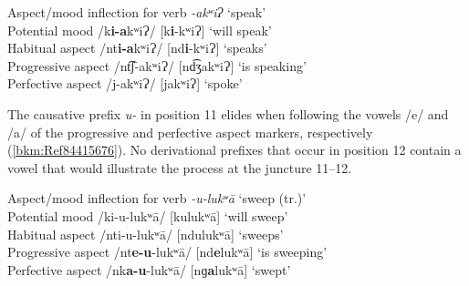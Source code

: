 \documentclass[output=paper]{langscibook}
\begin{document}
\ea\label{bkm:Ref14616697}Aspect/mood inflection for verb \textit{{}-akʷiɁ} `speak'\\ 

Potential mood \hspace{1.05cm}  /k\textbf{i-a}kʷiɁ/ \hspace{1.15cm}[k\textbf{i}{}-kʷiɁ] \hspace{1.15cm}`will speak' \\

Habitual aspect\hspace{1cm}     /nt\textbf{i-a}kʷiɁ/ \hspace{1cm}  [nd\textbf{i}{}-kʷiɁ] \hspace{1cm}`speaks' \\

Progressive aspect\hspace{0.55cm} /nt͡ʃ{}-akʷiɁ/ \hspace{1cm} [nd͡ʒakʷiɁ]  \hspace{0.9cm}`is speaking' \\

Perfective aspect\hspace{0.9cm} /j-akʷiɁ/\hspace{1.33cm} [jakʷiɁ] \hspace{1.25cm} `spoke' \\

\z 


The causative prefix \textit{u-} in position 11 elides when following the vowels /e/ and /a/ of the progressive and perfective aspect markers, respectively (\ref{bkm:Ref84415676}). No derivational prefixes that occur in position 12 contain a vowel that would illustrate the process at the juncture 11{}--12.


\ea\label{bkm:Ref84415676}Aspect/mood inflection for verb \textit{{}-u-lukʷā} `sweep (tr.)'\\

Potential mood\hspace{1.05cm}  /ki-u-lukʷā/                 \hspace{1cm}[kulukʷā]  \hspace{1cm}`will sweep' \\
Habitual aspect\hspace{1cm}   /nti-u-lukʷā/                 \hspace{0.88cm}[ndulukʷā]  \hspace{0.8cm}`sweeps' \\
Progressive aspect\hspace{0.55cm} /nt\textbf{e-u}{}-lukʷā/  \hspace{0.8cm}[nd\textbf{e}lukʷā]  \hspace{0.8cm}`is sweeping'\\
Perfective aspect\hspace{0.8cm} /nk\textbf{a-u}{}-lukʷā/  \hspace{0.7cm}[nɡ\textbf{a}lukʷā]  \hspace{0.8cm}`swept'\\
\z
\end{document}
